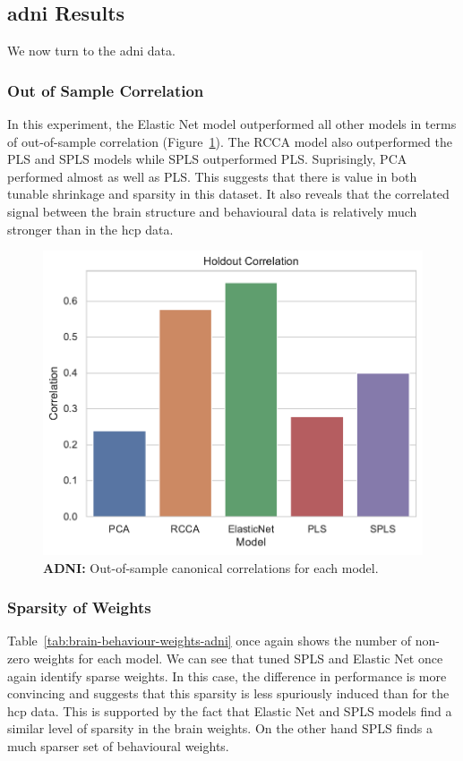 \subsection{\acrshort{adni} Results}\label{subsec:adni}

We now turn to the \acrshort{adni} data.

\subsubsection{Out of Sample Correlation}

In this experiment, the Elastic Net model outperformed all other models in terms of out-of-sample correlation (Figure~\ref{fig:performance}).
The RCCA model also outperformed the PLS and SPLS models while SPLS outperformed PLS.
Suprisingly, PCA performed almost as well as PLS.
This suggests that there is value in both tunable shrinkage and sparsity in this dataset.
It also reveals that the correlated signal between the brain structure and behavioural data is relatively much stronger than in the \acrshort{hcp} data.

\begin{figure}
    \centering
    \includegraphics[width=0.5\linewidth]{figures/adni/holdout_correlations}
    \caption{\textbf{ADNI:} Out-of-sample canonical correlations for each model.}\label{fig:performance}
\end{figure}

\subsubsection{Sparsity of Weights}

Table~\ref{tab:brain-behaviour-weights-adni} once again shows the number of non-zero \gls{weights} for each model.
We can see that tuned SPLS and Elastic Net once again identify sparse weights.
In this case, the difference in performance is more convincing and suggests that this sparsity is less spuriously induced than for the \acrshort{hcp} data.
This is supported by the fact that Elastic Net and SPLS models find a similar level of sparsity in the brain weights.
On the other hand SPLS finds a much sparser set of behavioural weights.

